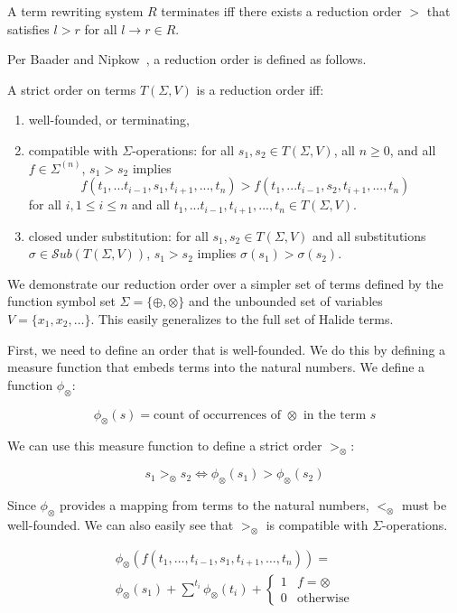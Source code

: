 \documentclass[sigplan,review,anonymous]{acmart}\settopmatter{printfolios=true,printccs=false,printacmref=false}
\begin{document}
\begin{theorem}\label{theorem:terminates}
A term rewriting system $R$ terminates iff there exists a reduction order $>$ that satisfies $l > r$ for all $l \rightarrow r \in R$.
\end{theorem}

Per Baader and Nipkow~\cite{baader1999term}, a reduction order is defined as follows.

\begin{definition}
A strict order on terms $T(\Sigma, V)$ is a reduction order iff: 
\begin{enumerate}
    \item well-founded, or terminating,
    \item compatible with $\Sigma$-operations: for all $s_1, s_2 \in T(\Sigma,V)$, all $n \geq 0$, and all $f \in \Sigma^{(n)}$, $s_1 > s_2$ implies
    \[ f(t_1,...t_{i-1},s_1,t_{i+1},...,t_n) > f(t_1,...t_{i-1},s_2,t_{i+1},...,t_n)
    \]
    for all $i, 1 \leq i \leq n$ and all $t_1,...t_{i-1},t_{i+1},...,t_n \in T(\Sigma,V)$.
    \item closed under substitution: for all $s_1, s_2 \in T(\Sigma,V)$ and all substitutions $\sigma \in \mathcal{S}ub(T(\Sigma,V))$, $s_1 > s_2$ implies $\sigma(s_1) > \sigma(s_2)$.
\end{enumerate}
\end{definition}

We demonstrate our reduction order over a simpler set of terms defined by the function symbol set $\Sigma = \{\oplus, \otimes\}$ and the unbounded set of variables $V = \{x_1, x_2, \ldots \}$. This easily generalizes to the full set of Halide terms.

First, we need to define an order that is well-founded. We do this by defining a measure function that embeds terms into the natural numbers. We define a function $\phi_\otimes$:

\[
\phi_\otimes(s) = \textrm{count of occurrences of } \otimes \textrm{ in the term } s
\]

We can use this measure function to define a strict order $>_\otimes$:

\[
s_1 >_\otimes s_2 \iff \phi_\otimes(s_1) > \phi_\otimes(s_2)
\]

Since $\phi_\otimes$ provides a mapping from terms to the natural numbers, $<_\otimes$ must be well-founded. We can also easily see that $>_\otimes$ is compatible with $\Sigma$-operations.

\[
\begin{aligned}
\phi_\otimes(f(t_1, \ldots, t_{i-1}, s_1, t_{i+1}, \ldots, t_n)) = \\
\phi_\otimes(s_1) + \sum^{t_i} \phi_\otimes(t_i) + \begin{cases} 1 & f = \otimes \\
0 & \textrm{otherwise} \end{cases}
\end{aligned}
\]
\end{document}
